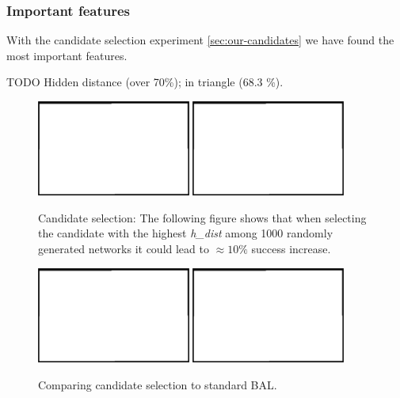 
\subsubsection{Important features}
\label{sec:results-candidates} 

With the candidate selection experiment \ref{sec:our-candidates} we have found the most important features. 

TODO Hidden distance (over 70\%); in triangle (68.3 \%). \\


\begin{figure}[H]
  \centering
  \includegraphics[width=0.45\textwidth]{img/placeholder.png}   
  \includegraphics[width=0.45\textwidth]{img/placeholder.png}    
  \caption{Candidate selection: The following figure shows that when selecting the candidate with the highest \emph{h\_dist} among 1000 randomly generated networks it could lead to $\approx 10\%$ success increase.}
  \label{fig:results-candidates-tlr}
\end{figure}


\begin{figure}[H]
  \centering
  \includegraphics[width=0.45\textwidth]{img/placeholder.png}   
  \includegraphics[width=0.45\textwidth]{img/placeholder.png}    
  \caption{Comparing candidate selection to standard BAL.}
  \label{fig:results-candidates-epoch}
\end{figure}

